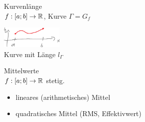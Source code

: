 \begin{itemize}
	\begin{figure}[h!]
		\item Kurvenlänge\\
		$f:[a;b]\to\mathbb{R}$, Kurve $\Gamma=G_f$
		
		\begin{minipage}{\linewidth-3.2cm}
			\centering
		\end{minipage}
		\begin{minipage}{3.1cm}
			\centering\includegraphics[width=3cm]{Bilder/228}
			\caption{Kurve mit Länge $l_\Gamma$}
		\end{minipage}
	\end{figure}
	
	\begin{figure}[h!]
		\item Mittelwerte\\
		$f:[a;b]\to\mathbb{R}$ stetig.
		
		\begin{itemize}
			\item lineares (arithmetisches) Mittel
			

			\item quadratisches Mittel (RMS, Effektivwert)
			
		\end{itemize}
	\end{figure}
	
\end{itemize}